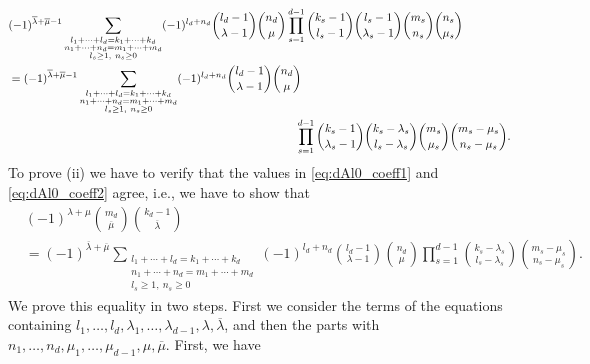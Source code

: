 \documentclass[12pt,reqno]{amsart}
\numberwithin{equation}{section}
\theoremstyle{definition}
\begin{document}
\begin{align} \label{eq:dAl0_coeff2}
&(-1)^{\overline{\lambda}+\overline{\mu}-1} \sum_{\substack{l_1+\cdots+l_d=k_1+\cdots+k_d \\ n_1+\cdots+n_d=m_1+\cdots+m_d \\ l_s\geq1,\ n_s\geq0}} (-1)^{l_d+n_d} \binom{l_d-1}{\lambda-1}\binom{n_d}{\mu}\prod_{s=1}^{d-1} \binom{k_s-1}{l_s-1} \binom{l_s-1}{\lambda_s-1} \binom{m_s}{n_s}\binom{n_s}{\mu_s} \nonumber\\
&=(-1)^{\overline{\lambda}+\overline{\mu}-1} \sum_{\substack{l_1+\cdots+l_d=k_1+\cdots+k_d \\ n_1+\cdots+n_d=m_1+\cdots+m_d \\ l_s\geq1,\ n_s\geq0}} (-1)^{l_d+n_d}\binom{l_d-1}{\lambda-1}\binom{n_d}{\mu}\\
&\hspace{8,8cm}\prod_{s=1}^{d-1} \binom{k_s-1}{\lambda_s-1} \binom{k_s-\lambda_s}{l_s-\lambda_s} \binom{m_s}{\mu_s}\binom{m_s-\mu_s}{n_s-\mu_s}. \nonumber
\end{align}
To prove (ii) we have to verify that the values in \eqref{eq:dAl0_coeff1} and \eqref{eq:dAl0_coeff2} agree, i.e., we have to show that
\begin{align} \label{eq:dAl0_coeff1_equal_coeff2}
&(-1)^{\lambda+\mu} \binom{m_d}{\overline{\mu}}\binom{k_d-1}{\overline{\lambda}} \\
&=(-1)^{\overline{\lambda}+\overline{\mu}} \sum_{\substack{l_1+\cdots+l_d=k_1+\cdots+k_d \\ n_1+\cdots+n_d=m_1+\cdots+m_d \\ l_s\geq1,\ n_s\geq0}} (-1)^{l_d+n_d} \binom{l_d-1}{\lambda-1}\binom{n_d}{\mu} \prod_{s=1}^{d-1}  \binom{k_s-\lambda_s}{l_s-\lambda_s} \binom{m_s-\mu_s}{n_s-\mu_s}.
\end{align}
We prove this equality in two steps. First we consider the terms of the equations containing $l_1,\ldots,l_d,\lambda_1,\ldots,\lambda_{d-1},\lambda,\overline{\lambda}$, and then the parts with $n_1,\ldots,n_d,\mu_1,\ldots,\mu_{d-1},\mu,\overline{\mu}$. First, we have
\end{document}
